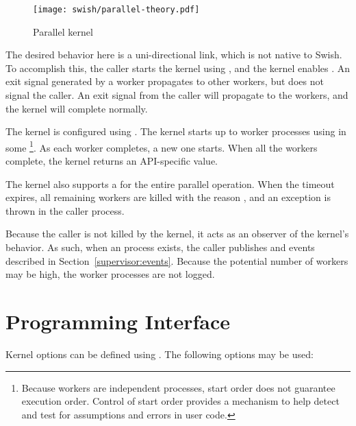 \begin{figure}
  \center\texttt{[image: swish/parallel-theory.pdf]}
  \caption{\label{fig:parallel}Parallel kernel}
\end{figure}

The desired behavior here is a uni-directional link, which is not
native to Swish. To accomplish this, the caller starts the kernel
using , and the kernel enables
. An exit signal generated by a worker
propagates to other workers, but does not signal the caller. An exit
signal from the caller will propagate to the workers, and the kernel
will complete normally.

The kernel is configured using . The kernel
starts up to  worker processes using
 in some \footnote{Because workers are
independent processes, start order does not guarantee execution
order. Control of start order provides a mechanism to help detect and
test for assumptions and errors in user code.}. As each worker
completes, a new one starts. When all the workers complete, the kernel
returns an API-specific value.

The kernel also supports a  for the entire parallel
operation. When the timeout expires, all remaining workers are killed
with the reason , and an exception is thrown in the
caller process.

Because the caller is not killed by the kernel, it acts as an observer
of the kernel's behavior. As such, when an  process
exists, the caller publishes  and
 events described in
Section~\ref{supervisor:events}. Because the potential number of
workers may be high, the worker processes are not logged.

\section {Programming Interface}

Kernel options can be defined using
.
The following options may be used:
\label{parallel:options}

